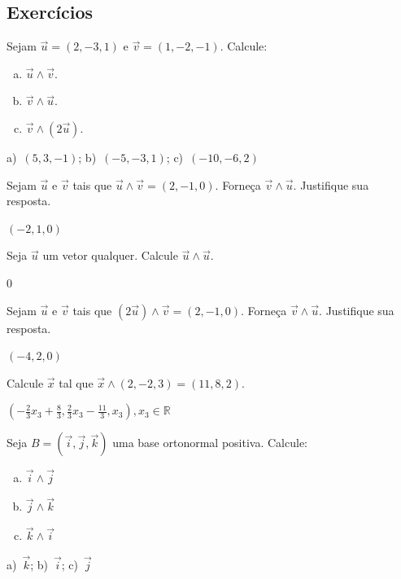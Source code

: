 \subsection*{Exercícios}

\begin{exer}
  Sejam $\vec{u}=(2,-3,1)$ e $\vec{v}=(1,-2,-1)$. Calcule:
  \begin{enumerate}[a)]
  \item $\vec{u}\land\vec{v}$.
  \item $\vec{v}\land\vec{u}$.
  \item $\vec{v}\land(2\vec{u})$.
  \end{enumerate}
\end{exer}
\begin{resp}
  a)~$(5,3,-1)$; b)~$(-5,-3,1)$; c)~$(-10,-6,2)$
\end{resp}

\begin{exer}
  Sejam $\vec{u}$ e $\vec{v}$ tais que $\vec{u}\land\vec{v}=(2,-1,0)$. Forneça $\vec{v}\land\vec{u}$. Justifique sua resposta.
\end{exer}
\begin{resp}
  $(-2,1,0)$
\end{resp}

\begin{exer}
  Seja $\vec{u}$ um vetor qualquer. Calcule $\vec{u}\land\vec{u}$.
\end{exer}
\begin{resp}
  $0$
\end{resp}

\begin{exer}
  Sejam $\vec{u}$ e $\vec{v}$ tais que $(2\vec{u})\land\vec{v}=(2,-1,0)$. Forneça $\vec{v}\land\vec{u}$. Justifique sua resposta.
\end{exer}
\begin{resp}
  $(-4,2,0)$
\end{resp}

\begin{exer}
  Calcule $\vec{x}$ tal que $\vec{x}\land (2,-2,3)=(11,8,2)$.
\end{exer}
\begin{resp}
  $\left(-\frac{2}{3}x_3+\frac{8}{3},\frac{2}{3}x_3-\frac{11}{3},x_3\right), x_3\in\mathbb{R}$
\end{resp}

\begin{exer}
  Seja $B=(\vec{i},\vec{j},\vec{k})$ uma base ortonormal positiva. Calcule:
  \begin{enumerate}[a)]
  \item $\vec{i}\land\vec{j}$
  \item $\vec{j}\land\vec{k}$
  \item $\vec{k}\land\vec{i}$
  \end{enumerate}
\end{exer}
\begin{resp}
  a)~$\vec{k}$; b)~$\vec{i}$; c)~$\vec{j}$
\end{resp}

